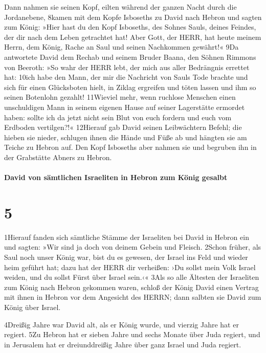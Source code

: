 Dann nahmen sie seinen Kopf, eilten während der ganzen Nacht durch die
Jordanebene, 8kamen mit dem Kopfe Isboseths zu David nach Hebron und
sagten zum König: »Hier hast du den Kopf Isboseths, des Sohnes Sauls,
deines Feindes, der dir nach dem Leben getrachtet hat! Aber Gott, der
HERR, hat heute meinem Herrn, dem König, Rache an Saul und seinen
Nachkommen gewährt!« 9Da antwortete David dem Rechab und seinem Bruder
Baana, den Söhnen Rimmons von Beeroth: »So wahr der HERR lebt, der mich
aus aller Bedrängnis errettet hat: 10ich habe den Mann, der mir die
Nachricht von Sauls Tode brachte und sich für einen Glücksboten hielt,
in Ziklag ergreifen und töten lassen und ihm so seinen Botenlohn
gezahlt! 11Wieviel mehr, wenn ruchlose Menschen einen unschuldigen Mann
in seinem eigenen Hause auf seiner Lagerstätte ermordet haben: sollte
ich da jetzt nicht sein Blut von euch fordern und euch vom Erdboden
vertilgen?!« 12Hierauf gab David seinen Leibwächtern Befehl; die hieben
sie nieder, schlugen ihnen die Hände und Füße ab und hängten sie am
Teiche zu Hebron auf. Den Kopf Isboseths aber nahmen sie und begruben
ihn in der Grabstätte Abners zu Hebron.

\hypertarget{david-von-suxe4mtlichen-israeliten-in-hebron-zum-kuxf6nig-gesalbt}{%
\paragraph{David von sämtlichen Israeliten in Hebron zum König
gesalbt}\label{david-von-suxe4mtlichen-israeliten-in-hebron-zum-kuxf6nig-gesalbt}}

\hypertarget{section-4}{%
\section{5}\label{section-4}}

1Hierauf fanden sich sämtliche Stämme der Israeliten bei David in Hebron
ein und sagten: »Wir sind ja doch von deinem Gebein und Fleisch. 2Schon
früher, als Saul noch unser König war, bist du es gewesen, der Israel
ins Feld und wieder heim geführt hat; dazu hat der HERR dir verheißen:
›Du sollst mein Volk Israel weiden, und du sollst Fürst über Israel
sein.‹« 3Als so alle Ältesten der Israeliten zum König nach Hebron
gekommen waren, schloß der König David einen Vertrag mit ihnen in Hebron
vor dem Angesicht des HERRN; dann salbten sie David zum König über
Israel.

4Dreißig Jahre war David alt, als er König wurde, und vierzig Jahre hat
er regiert. 5Zu Hebron hat er sieben Jahre und sechs Monate über Juda
regiert, und in Jerusalem hat er dreiunddreißig Jahre über ganz Israel
und Juda regiert.

